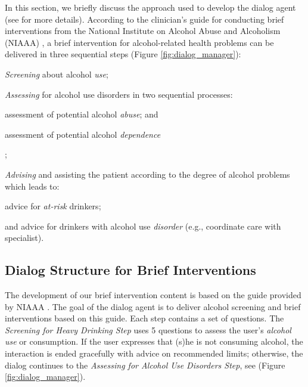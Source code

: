 \documentclass[letterpaper]{article}
\begin{document}
\begin{sloppy}
In this section, we briefly discuss the approach used to develop the dialog 
agent (see \cite{YASCLL14} for more details). According to the 
clinician's guide for conducting brief interventions from the National Institute on Alcohol Abuse 
and Alcoholism (NIAAA) \cite{national2007helping}, a brief intervention for alcohol-related health 
problems can be delivered in three sequential steps (Figure 
\ref{fig:dialog_manager}): 
\begin{inparaenum}[1)] 
\item {\em Screening} about alcohol {\em use}; 
\item {\em Assessing} for alcohol use disorders in two sequential processes: 
  \begin{inparaenum}[a)] 
    \item assessment of potential alcohol {\em abuse}; and 
    \item assessment  of potential alcohol {\em dependence}
  \end{inparaenum}; 
\item {\em Advising} and assisting the patient according to the degree of alcohol problems which 
leads to: 
  \begin{inparaenum} 
    \item advice for {\em at-risk} drinkers; 
    \item and advice for drinkers with alcohol use {\em disorder} (e.g., coordinate care with 
specialist).
  \end{inparaenum} 
\end{inparaenum}

\subsection{Dialog Structure for Brief Interventions}

The development of our brief intervention content is based on the guide provided by 
NIAAA \cite{national2006niaaa}. The goal of the dialog agent is to deliver alcohol screening and 
brief interventions based on this guide. Each step contains a set of questions. The {\em Screening 
for Heavy Drinking  Step}
uses 5 questions to assess the user's {\em alcohol use} or consumption.  If the user 
expresses that (s)he is not consuming alcohol, the interaction is  ended gracefully with advice on 
recommended limits; otherwise, the dialog continues to the {\em Assessing for Alcohol Use Disorders 
Step}, see (Figure \ref{fig:dialog_manager}).


\end{sloppy}
\end{document}
